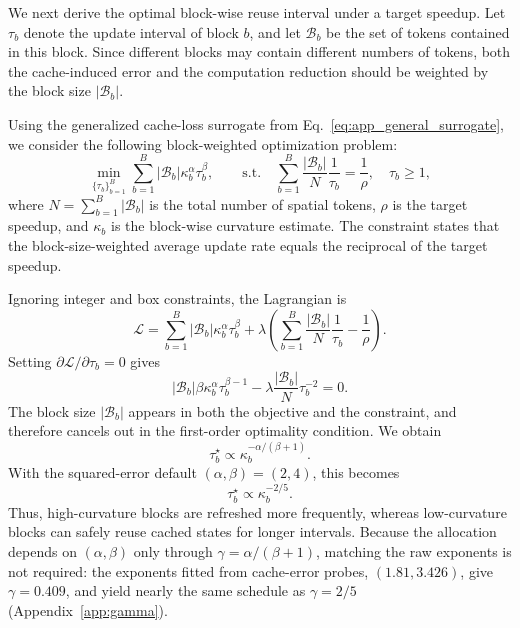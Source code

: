 We next derive the optimal block-wise reuse interval under a target
speedup. Let $\tau_b$ denote the update interval of block $b$, and let
$\mathcal{B}_b$ be the set of  tokens contained in this block.
Since different blocks may contain different numbers of tokens, both the
cache-induced error and the computation reduction should be weighted by
the block size $|\mathcal{B}_b|$.

Using the generalized cache-loss surrogate from
Eq.~\eqref{eq:app_general_surrogate}, we consider the following
block-weighted optimization problem:
\begin{equation}
    \min_{\{\tau_b\}_{b=1}^{B}}
    \sum_{b=1}^{B}
    |\mathcal{B}_b|
    \kappa_b^\alpha
    \tau_b^\beta,
    \qquad
    \mathrm{s.t.}
    \quad
    \sum_{b=1}^{B}
    \frac{|\mathcal{B}_b|}{N}
    \frac{1}{\tau_b}
    =
    \frac{1}{\rho},
    \quad
    \tau_b\ge 1,
    \label{eq:app_interval_opt}
\end{equation}
where $N=\sum_{b=1}^{B}|\mathcal{B}_b|$ is the total number of spatial
tokens, $\rho$ is the target speedup, and $\kappa_b$ is the block-wise
curvature estimate. The constraint states that the block-size-weighted
average update rate equals the reciprocal of the target speedup.

Ignoring integer and box constraints, the Lagrangian is
\begin{equation}
    \mathcal{L}
    =
    \sum_{b=1}^{B}
    |\mathcal{B}_b|
    \kappa_b^\alpha
    \tau_b^\beta
    +
    \lambda
    \left(
    \sum_{b=1}^{B}
    \frac{|\mathcal{B}_b|}{N}
    \frac{1}{\tau_b}
    -
    \frac{1}{\rho}
    \right).
\end{equation}
Setting $\partial\mathcal{L}/\partial\tau_b=0$ gives
\begin{equation}
    |\mathcal{B}_b|
    \beta
    \kappa_b^\alpha
    \tau_b^{\beta-1}
    -
    \lambda
    \frac{|\mathcal{B}_b|}{N}
    \tau_b^{-2}
    =
    0.
\end{equation}
The block size $|\mathcal{B}_b|$ appears in both the objective and the
constraint, and therefore cancels out in the first-order optimality
condition. We obtain
\begin{equation}
    \tau_b^\star
    \propto
    \kappa_b^{-\alpha/(\beta+1)}.
    \label{eq:app_tau_general}
\end{equation}
With the squared-error default $(\alpha,\beta)=(2,4)$, this becomes
\begin{equation}
    \tau_b^\star
    \propto
    \kappa_b^{-2/5}.
    \label{eq:app_tau_two_fifths}
\end{equation}
Thus, high-curvature blocks are refreshed more frequently, whereas
low-curvature blocks can safely reuse cached states for longer intervals.
Because the allocation depends on $(\alpha,\beta)$ only through
$\gamma=\alpha/(\beta+1)$, matching the raw exponents is not required:
the exponents fitted from cache-error probes, $(1.81,3.426)$, give
$\gamma=0.409$, and yield nearly the same schedule as $\gamma=2/5$
(Appendix~\ref{app:gamma}).

